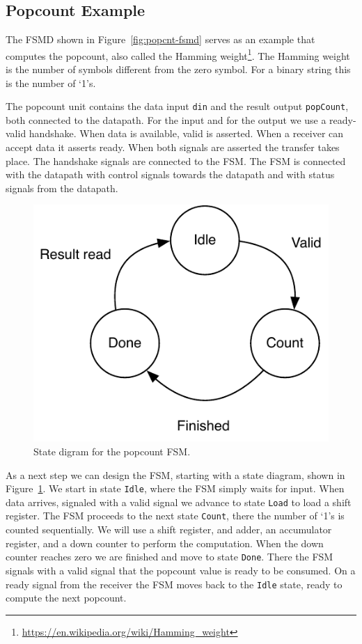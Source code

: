 \documentclass[%
    10pt,
    headinclude, footexclude,
    openright, %
    notitlepage,
    cleardoubleempty,
    headsepline,
    pointlessnumbers,
    bibtotoc, idxtotoc,
    ]{scrbook}
\newcommand{\code}[1]{{\small{\texttt{#1}}}}
\newcommand{\scale}{0.7}
\newcommand{\myref}[2]{\href{#1}{#2}}
\renewcommand{\myref}[2]{{#2}{\footnote{\url{#1}}}}
\begin{document}
\subsection{Popcount Example}

The FSMD shown in Figure~\ref{fig:popcnt-fsmd} serves as an example that computes the
popcount, also called the \myref{https://en.wikipedia.org/wiki/Hamming_weight}{Hamming weight}.
The Hamming weight is the number of symbols different from the zero symbol.
For a binary string this is the number of `1's.

The popcount unit contains the data input \code{din} and the result output \code{popCount},
both connected to the datapath. For the input and for the output we use a ready-valid handshake.
When data is available, valid is asserted. When a receiver can accept data it asserts ready.
When both signals are asserted the transfer takes place. The handshake signals are connected
to the FSM. The FSM is connected with the datapath with control signals towards the datapath
and with status signals from the datapath.

\begin{figure}
  \centering
  \includegraphics[scale=\scale]{figures/popcnt-states}
  \caption{State digram for the popcount FSM.}
  \label{fig:popcnt-states}
\end{figure}

As a next step we can design the FSM, starting with a state diagram, shown in
Figure~\ref{fig:popcnt-states}. We start in state \code{Idle}, where the FSM simply waits
for input. When data arrives, signaled with a valid signal we advance to state \code{Load}
to load a shift register. The FSM proceeds to the next state \code{Count}, there the number
of `1's is counted sequentially. We will use a shift register, and adder, an accumulator
register, and a down counter to perform the computation. When the down counter reaches
zero we are finished and move to state \code{Done}. There the FSM signals with a valid
signal that the popcount value is ready to be consumed. On a ready signal from the
receiver the FSM moves back to the \code{Idle} state, ready to compute the next popcount.
\end{document}

